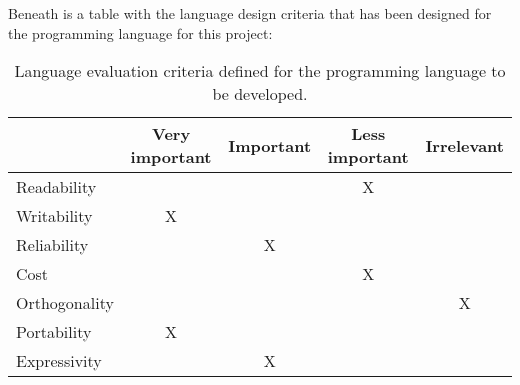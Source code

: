 Beneath is a table with the language design criteria that has been designed for the programming language for this project:
\begin{table}[htbp]
\centering
\begin{tabular}{|l|c|c|c|c|}
\hline
& Very important & Important & Less important & Irrelevant \\ \hline
Readability & & & X & \\ \hline
Writability & X & & & \\ \hline
Reliability & & X & & \\ \hline
Cost & & & X & \\ \hline
Orthogonality & & & & X \\ \hline
Portability & X & & & \\ \hline
Expressivity & & X & & \\ \hline
\end{tabular}
\caption{Language evaluation criteria defined for the programming language to be developed.}
\label{tbl:evaluation criteria}
\end{table}